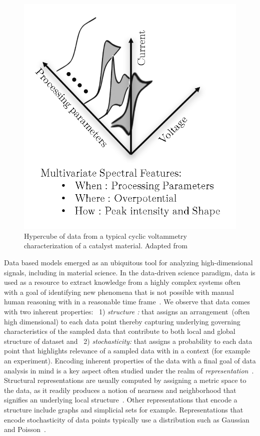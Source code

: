 \begin{figure}[h!]
    \centering
    \includegraphics[width=0.45\columnwidth]{Chapter-1/figures/spectral_hypercube.png}
    \caption{Hypercube of data from a typical cyclic voltammetry characterization of a catalyst material. Adapted from~\cite{rajan2013informatics}}
    \label{fig:spectrahypercube}
\end{figure}


Data based models emerged as an ubiquitous tool for analyzing high-dimensional signals, including in material science. 
In the data-driven science paradigm, data is used as a resource to extract knowledge from a highly complex systems often with a goal of identifying new phenomena that is not possible with manual human reasoning with in a reasonable time frame~\cite{brunton2019data}.
We observe that data comes with two inherent properties: ~1) \textit{structure :} that assigns an arrangement~(often high dimensional) to each data point thereby capturing underlying governing characteristics of the sampled data that contribute to both local and global structure of dataset and ~2) \textit{stochasticity:} that assigns a probability to each data point that highlights relevance of a sampled data with in a context (for example an experiment). 
Encoding inherent properties of the data with a final goal of data analysis in mind is a key aspect often studied under the realm of \textit{representation}~\cite{bengio2013representation}. 
Structural representations are usually computed by assigning a metric space to the data, as it readily produces a notion of nearness and neighborhood that signifies an underlying local structure~\cite{mcinnes2018umap}. 
Other representations that encode a structure include graphs and simplicial sets for example. 
Representations that encode stochasticity of data points typically use a distribution such as Gaussian~\cite{gardner2015bayesian,gavaghan2018use} and Poisson~\cite{flory1940molecular}.


